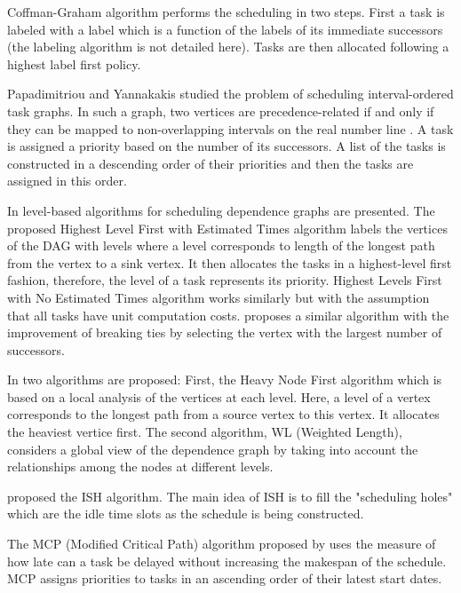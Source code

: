 Coffman-Graham algorithm \cite{coffman:1972} performs the scheduling in two steps. First a task is labeled with a label which is a function of the labels of its immediate successors (the labeling algorithm is not detailed here). Tasks are then allocated following a highest label first policy. 

Papadimitriou and Yannakakis \cite{papadimitriou:1979} studied the problem of scheduling interval-ordered task graphs. In such a graph, two vertices are precedence-related if and only if they can be mapped to non-overlapping intervals on the real number line \cite{fishburn:1985}. A task is assigned a priority based on the number of its successors. A list of the tasks is constructed in a descending order of their priorities and then the tasks are assigned in this order. 

In \cite{adam:1974} level-based algorithms for scheduling dependence graphs are presented. The proposed Highest Level First with Estimated Times algorithm labels the vertices of the DAG with levels where a level corresponds to length of  the longest path from the vertex to a sink vertex. It then allocates the tasks in a highest-level first fashion, therefore, the level of a task represents its priority. Highest Levels First with No Estimated Times algorithm works similarly but with the assumption that all tasks have unit computation costs. \cite{kasahara:1984} proposes a similar algorithm with the improvement of breaking ties by selecting the vertex with the largest number of successors. 

In \cite{shirazi:1990} two algorithms are proposed: First, the Heavy Node First algorithm which is based on a local analysis of the vertices at each level. Here, a level of a vertex corresponds to the longest path from a source vertex to this vertex. It allocates the heaviest vertice first. The second algorithm, WL (Weighted Length), considers a global view of the dependence graph by taking into account the relationships among the nodes at different levels. 

\cite{kruatrachue:1987} proposed the ISH algorithm. The main idea of ISH is to fill the "scheduling holes"  which are the idle time slots as the schedule is being constructed.

The MCP (Modified Critical Path) algorithm proposed by \cite{wu:1990} uses the measure of how late can a task be delayed without increasing the makespan of the schedule. MCP assigns priorities to tasks in an ascending order of their latest start dates. 

